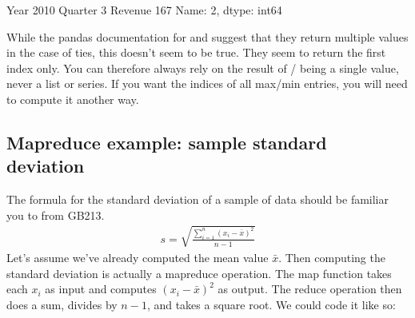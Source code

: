\documentclass[letterpaper,10pt,english]{sphinxmanual}
\begin{document}
\begin{sphinxVerbatim}[commandchars=\\\{\}]
\PYG{p}{[}\PYG{p}{]}
\end{sphinxVerbatim}

\begin{sphinxVerbatim}[commandchars=\\\{\}]
Year       2010
Quarter       3
Revenue     167
Name: 2, dtype: int64
\end{sphinxVerbatim}

While the pandas documentation for  and  suggest that they return multiple values in the case of ties, this doesn’t seem to be true.  They seem to return the first index only.  You can therefore always rely on the result of / being a single value, never a list or series.  If you want the indices of all max/min entries, you will need to compute it another way.


\subsection{Map\sphinxhyphen{}reduce example: sample standard deviation}
\label{\detokenize{chapter-11-processing-rows:map-reduce-example-sample-standard-deviation}}
The formula for the standard deviation of a sample of data should be familiar you to from GB213.
\begin{equation*}
\begin{split} s=\sqrt{\frac{\sum_{i=1}^n (x_i-\bar x)^2}{n-1}} \end{split}
\end{equation*}
Let’s assume we’ve already computed the mean value \(\bar x\).  Then computing the standard deviation is actually a map\sphinxhyphen{}reduce operation.  The map function takes each \(x_i\) as input and computes \((x_i-\bar x)^2\) as output.  The reduce operation then does a sum, divides by \(n-1\), and takes a square root.  We could code it like so:
\end{document}
